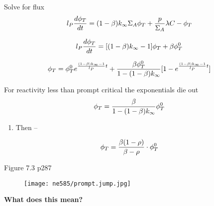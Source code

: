 \documentclass[aspectratio=1610,pdftex,dvipsnames,compress,xcolor={dvipsnames}]{beamer}
\begin{document}
\begin{frame}{Solve for flux}
    \begin{equation}
        \LARGE
        l_P \frac{d\phi_T}{dt} =(1-\beta) k_\infty \Sigma_A \phi_T + \frac{p}{\Sigma_A} \lambda C - \phi_T
    \end{equation}

    \begin{equation}
        \LARGE
        l_P \frac{d\phi_T}{dt} = [(1-\beta)k_\infty-1] \phi_T + \beta \phi_T^0
    \end{equation}

    \begin{equation}
        \LARGE
        \phi_T = \phi_T^0 e^{\frac{(1-\beta) k_\infty-1} {l_P}t} + \frac{\beta \phi_T^0}{1 - (1-\beta) k_\infty}[1 - e^{\frac{(1-\beta) k_\infty - 1} {l_P}t}]
    \end{equation}
\end{frame}


\begin{frame}{For reactivity less than prompt critical the exponentials die out}
    \begin{equation}
        \LARGE
        \phi_T = \frac{\beta}{1 - (1-\beta) k_\infty} \phi_T^0
    \end{equation}

    \vspace*{\fill}

    \begin{enumerate}[series=outerlist,topsep=0pt,itemsep=21pt,leftmargin=*,label=(\arabic*)]
        \item[]Then --
    \end{enumerate}

    \vspace*{\fill}

    \begin{equation}
        \LARGE
        \phi_T = \frac{\beta (1 - \rho)}{\beta - \rho} \cdot \phi_T^0
    \end{equation}
\end{frame}


\begin{frame}{Figure 7.3 p287}
    \begin{figure}
        \centering
        \texttt{[image: ne585/prompt.jump.jpg]}
    \end{figure}
\end{frame}


\begin{frame}[plain]{}
    \centering\LARGE\textbf{What does this mean?}
\end{frame}
\end{document}
